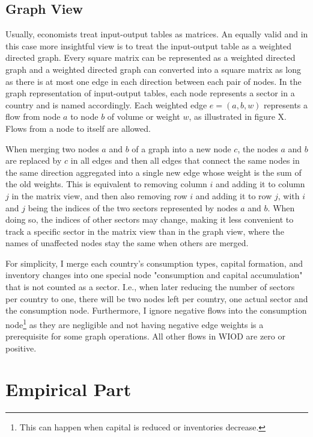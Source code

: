 \documentclass[english]{uzhpub}
\begin{document}
\subsection{Graph View}
\label{sec:graphview}
Usually, economists treat input-output tables as matrices. An equally valid and in this case more insightful view is to treat the input-output table as a weighted directed graph. Every square matrix can be represented as a weighted directed graph and a weighted directed graph can converted into a square matrix as long as there is at most one edge in each direction between each pair of nodes. In the graph representation of input-output tables, each node represents a sector in a country and is named accordingly. Each weighted edge $e=(a, b, w)$ represents a flow from node $a$ to node $b$ of volume or weight $w$, as illustrated in figure X. Flows from a node to itself are allowed.

When merging two nodes $a$ and $b$ of a graph into a new node $c$, the nodes $a$ and $b$ are replaced by $c$ in all edges and then all edges that connect the same nodes in the same direction aggregated into a single new edge whose weight is the sum of the old weights. This is equivalent to removing column $i$ and adding it to column $j$ in the matrix view, and then also removing row $i$ and adding it to row $j$, with $i$ and $j$ being the indices of the two sectors represented by nodes $a$ and $b$. When doing so, the indices of other sectors may change, making it less convenient to track a specific sector in the matrix view than in the graph view, where the names of unaffected nodes stay the same when others are merged.

For simplicity, I merge each country's consumption types, capital formation, and inventory changes into one special node "consumption and capital accumulation" that is not counted as a sector. I.e., when later reducing the number of sectors per country to one, there will be two nodes left per country, one actual sector and the consumption node. Furthermore, I ignore negative flows into the consumption node\footnote{This can happen when capital is reduced or inventories decrease.} as they are negligible and not having negative edge weights is a prerequisite for some graph operations. All other flows in WIOD are zero or positive.

\section{Empirical Part}
\end{document}
